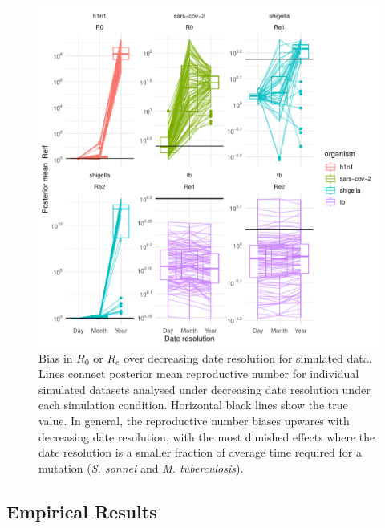 \documentclass{article}
\begin{document}
\begin{spacing}{1.5}
\begin{figure}
    \centering
    \includegraphics[width = 0.75\linewidth]{sim_Re_trajectory.pdf}
    \caption{Bias in $R_0$ or $R_e$ over decreasing date resolution for simulated data. Lines connect posterior mean reproductive number for individual simulated datasets analysed under decreasing date resolution under each simulation condition. Horizontal black lines show the true value. In general, the reproductive number biases upwares with decreasing date resolution, with the most dimished effects where the date resolution is a smaller fraction of average time required for a mutation (\textit{S. sonnei} and \textit{M. tuberculosis}).}
    \label{fig:simR0}
\end{figure}

\subsection*{Empirical Results}


\end{spacing}
\end{document}
